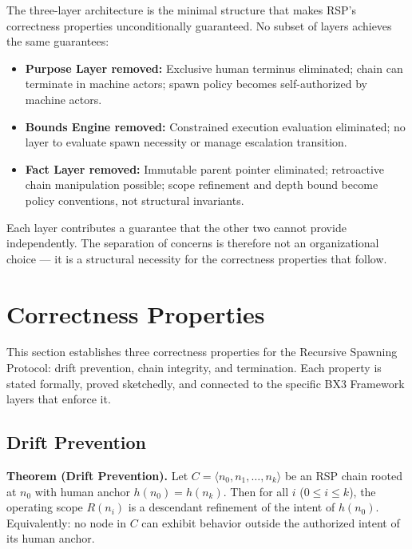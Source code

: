 The three-layer architecture is the minimal structure that makes RSP's correctness properties unconditionally guaranteed. No subset of layers achieves the same guarantees:

\begin{itemize}
    \item \textbf{Purpose Layer removed:} Exclusive human terminus eliminated; chain can terminate in machine actors; spawn policy becomes self-authorized by machine actors.
    \item \textbf{Bounds Engine removed:} Constrained execution evaluation eliminated; no layer to evaluate spawn necessity or manage escalation transition.
    \item \textbf{Fact Layer removed:} Immutable parent pointer eliminated; retroactive chain manipulation possible; scope refinement and depth bound become policy conventions, not structural invariants.
\end{itemize}

Each layer contributes a guarantee that the other two cannot provide independently. The separation of concerns is therefore not an organizational choice — it is a structural necessity for the correctness properties that follow.

\section{Correctness Properties}
\label{sec:rs-correctness}

This section establishes three correctness properties for the Recursive Spawning Protocol: drift prevention, chain integrity, and termination. Each property is stated formally, proved sketchedly, and connected to the specific BX3 Framework layers that enforce it.

\subsection{Drift Prevention}
\label{sec:rs-drift-prevention}

\medskip
\noindent\textbf{Theorem (Drift Prevention).} Let $C = \langle n_0, n_1, \ldots, n_k \rangle$ be an RSP chain rooted at $n_0$ with human anchor $h(n_0) = h(n_k)$. Then for all $i$ ($0 \leq i \leq k$), the operating scope $R(n_i)$ is a descendant refinement of the intent of $h(n_0)$. Equivalently: no node in $C$ can exhibit behavior outside the authorized intent of its human anchor.

